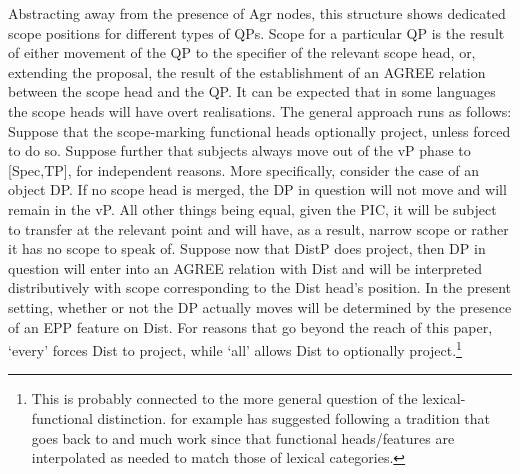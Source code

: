 \documentclass[charis]{glossa}
\begin{document}
Abstracting away from the presence of Agr nodes, this structure shows dedicated scope positions for different types of QPs.  Scope for a particular QP is the result of either movement of the QP to the specifier of the relevant scope head, or, extending the proposal, the result of the establishment of an AGREE relation between the scope head and the QP.  It can be expected that in some languages the scope heads will have overt realisations.  The general approach runs as follows:  Suppose that the scope-marking functional heads optionally project, unless forced to do so.  Suppose further that subjects always move out of the vP phase to [Spec,TP], for independent reasons.
More specifically, consider the case of an object DP.  If no scope head is merged, the DP in question will not move and will remain in the vP.   All other things being equal, given the  PIC, it will be subject to transfer at the relevant point and will have, as a result, narrow scope or rather it has no scope to speak of. Suppose now that DistP does project, then DP in question will enter into an AGREE relation with Dist and will be  interpreted distributively with scope corresponding to the Dist head's position.  In the present setting, whether or not the DP actually moves will be determined by the presence of an EPP feature on Dist.
For reasons that go beyond the reach of this paper, `every' forces Dist to project, while `all' allows Dist to optionally project.\footnote{This is probably connected to the more general question of the lexical-functional distinction. \cite{hegarty:93, hegarty:05} for example has suggested following a tradition that goes back to \citet{abney:87} and much work since that functional heads/features are interpolated  as needed to match those of lexical categories.}
\end{document}
